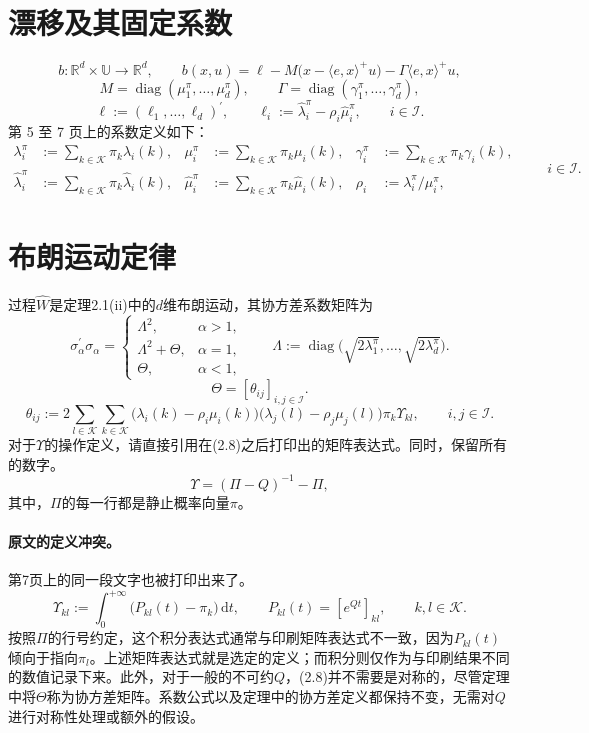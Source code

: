 \documentclass{article}
\begin{document}
\section*{漂移及其固定系数}
\[
b:\mathbb R^d\times\mathbb U\longrightarrow\mathbb R^d,
\qquad
b(x,u)=\ell-M\bigl(x-\langle e,x\rangle^+u\bigr)-\Gamma\langle e,x\rangle^+u,
\]
\[
M=\operatorname{diag}(\mu_1^\pi,\ldots,\mu_d^\pi),
\qquad
\Gamma=\operatorname{diag}(\gamma_1^\pi,\ldots,\gamma_d^\pi),
\]
\[
\ell:=(\ell_1,\ldots,\ell_d)^\prime,
\qquad
\ell_i:=\hat\lambda_i^\pi-\rho_i\hat\mu_i^\pi,
\qquad i\in\mathcal I.
\]
第 5 至 7 页上的系数定义如下：
\[
\begin{aligned}
\lambda_i^\pi&:=\sum_{k\in\mathcal K}\pi_k\lambda_i(k),&
\mu_i^\pi&:=\sum_{k\in\mathcal K}\pi_k\mu_i(k),&
\gamma_i^\pi&:=\sum_{k\in\mathcal K}\pi_k\gamma_i(k),\\
\hat\lambda_i^\pi&:=\sum_{k\in\mathcal K}\pi_k\hat\lambda_i(k),&
\hat\mu_i^\pi&:=\sum_{k\in\mathcal K}\pi_k\hat\mu_i(k),&
\rho_i&:=\lambda_i^\pi/\mu_i^\pi,
\end{aligned}
\qquad i\in\mathcal I.
\]

\section*{布朗运动定律}
过程\(\hat W\)是定理2.1(ii)中的\(d\)维布朗运动，其协方差系数矩阵为
\[
\sigma_\alpha^\prime\sigma_\alpha=
\begin{cases}
\Lambda^2,&\alpha>1,\\
\Lambda^2+\Theta,&\alpha=1,\\
\Theta,&\alpha<1,
\end{cases}
\qquad
\Lambda:=\operatorname{diag}\bigl(\sqrt{2\lambda_1^\pi},\ldots,\sqrt{2\lambda_d^\pi}\bigr).
\]
\[
\Theta=[\theta_{ij}]_{i,j\in\mathcal I}.
\]
\begin{equation}
\theta_{ij}:=2\sum_{l\in\mathcal K}\sum_{k\in\mathcal K}
\bigl(\lambda_i(k)-\rho_i\mu_i(k)\bigr)
\bigl(\lambda_j(l)-\rho_j\mu_j(l)\bigr)
\pi_k\Upsilon_{kl},\qquad i,j\in\mathcal I.
\tag{2.8}
\end{equation}
对于\(\Upsilon\)的操作定义，请直接引用在(2.8)之后打印出的矩阵表达式。同时，保留所有的数字。
\[
\Upsilon=(\Pi-Q)^{-1}-\Pi,
\]
其中，\(\Pi\)的每一行都是静止概率向量\(\pi\)。

\paragraph{原文的定义冲突。}
第7页上的同一段文字也被打印出来了。
\[
\Upsilon_{kl}:=\int_0^{+\infty}\bigl(P_{kl}(t)-\pi_k\bigr)\,\mathrm dt,
\qquad P_{kl}(t)=[e^{Qt}]_{kl},\qquad k,l\in\mathcal K.
\]
按照\(\Pi\)的行号约定，这个积分表达式通常与印刷矩阵表达式不一致，因为\(P_{kl}(t)\)倾向于指向\(\pi_l\)。上述矩阵表达式就是选定的定义；而积分则仅作为与印刷结果不同的数值记录下来。此外，对于一般的不可约\(Q\)，(2.8)并不需要是对称的，尽管定理中将\(\Theta\)称为协方差矩阵。系数公式以及定理中的协方差定义都保持不变，无需对\(Q\)进行对称性处理或额外的假设。
\end{document}

